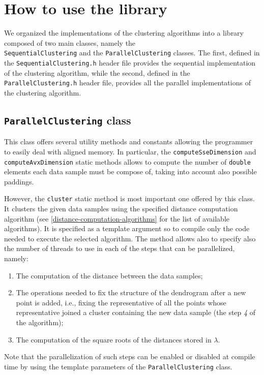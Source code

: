 \documentclass{article}
\begin{document}

\hypertarget{how-to-use-the-library}{
\section{How to use the library}
\label{how-to-use-the-library}}


We organized the implementations of the clustering algorithms into a library composed of two
main classes, namely the\\
\texttt{SequentialClustering} and the \texttt{ParallelClustering} classes.
The first, defined in the \texttt{SequentialClustering.h} header file provides the sequential
implementation of the clustering algorithm, while the second, defined in the
\texttt{ParallelClustering.h} header file, provides all the parallel implementations of the
clustering algorithm.

\hypertarget{parallel-clustering}{%
\subsection{\texttt{ParallelClustering} class}
\label{parallel-clustering}}
This class offers several utility methods and constants allowing the programmer to easily deal
with aligned memory. In particular, the \texttt{computeSseDimension} and
\texttt{computeAvxDimension} static methods allows to compute the number of \texttt{double}
elements each data sample must be compose of, taking into account also possible paddings.

However, the \texttt{cluster} static method is most important one offered by this class. It clusters
the given data samples using the specified distance computation algorithm (see
\ref{distance-computation-algorithms} for the list of available algorithms).
It is specified as a template argument so to compile only the code needed to execute the selected
algorithm.
The method allows also to specify also the number of threads to use in each of the steps that can be
parallelized, namely:
\begin{enumerate}
\item The computation of the distance between the data samples;
\item The operations needed to fix the structure of the dendrogram after a new point is
added, i.e., fixing the representative of all the points whose representative joined a
cluster containing the new data sample (the step \textit{4} of the algorithm);
\item The computation of the square roots of the distances stored in $\lambda$.
\end{enumerate}
Note that the parallelization of such steps can be enabled or disabled at compile time by using the
template parameters of the \texttt{ParallelClustering} class.
\end{document}
